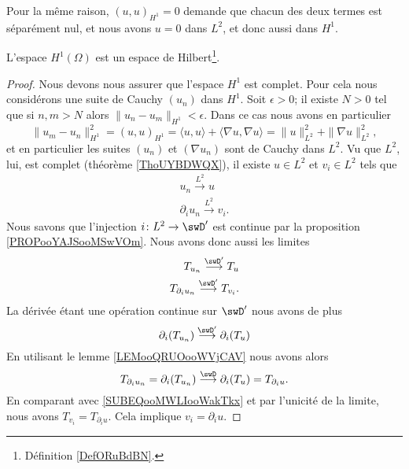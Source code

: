 Pour la même raison, \( (u,u)_{H^1}=0\) demande que chacun des deux termes est séparément nul, et nous avons \( u=0\) dans \( L^2\), et donc aussi dans \( H^1\).

\begin{theorem}
    L'espace \( H^1(\Omega)\) est un espace de Hilbert\footnote{Définition \ref{DefORuBdBN}.}.
\end{theorem}

\begin{proof}
    Nous devons nous assurer que l'espace \( H^1\) est complet. Pour cela nous considérons une suite de Cauchy \( (u_n)\) dans \( H^1\). Soit \( \epsilon>0\); il existe \( N>0\) tel que si \( n,m>N\) alors \( \| u_n-u_m \|_{H^1}<\epsilon\). Dans ce cas nous avons en particulier
    \begin{equation}
        \| u_m-u_n \|_{H^1}^2=(u,u)_{H^1}=\langle u, u\rangle +\langle \nabla u, \nabla u\rangle =\| u \|_{L^2}^2+\| \nabla u \|_{L^2}^2,
    \end{equation}
    et en particulier les suites \( (u_n)\) et \( (\nabla u_n)\) sont de Cauchy dans \( L^2\). Vu que \( L^2\), lui, est complet (théorème \ref{ThoUYBDWQX}), il existe \( u\in L^2\) et \( v_i\in L^2\) tels que
    \begin{subequations}
        \begin{align}
            u_n\stackrel{L^2}{\longrightarrow}u\\
            \partial_iu_n\stackrel{L^2}{\longrightarrow}v_i.
        \end{align}
    \end{subequations}
    Nous savons que l'injection \( i\colon L^2\to \swD'\) est continue par la proposition \ref{PROPooYAJSooMSwVOm}. Nous avons donc aussi les limites
    \begin{subequations}
        \begin{align}
            T_{u_n}\stackrel{\swD'}{\longrightarrow}T_u\\
            T_{\partial_i u_n}\stackrel{\swD'}{\longrightarrow}T_{v_i}.     \label{SUBEQooMWLIooWakTkx}
        \end{align}
    \end{subequations}
    La dérivée étant une opération continue sur \( \swD'\) nous avons de plus
    \begin{equation}
        \partial_i(T_{u_n})\stackrel{\swD'}{\longrightarrow}\partial_i(T_u)
    \end{equation}
    En utilisant le lemme \ref{LEMooQRUOooWVjCAV} nous avons alors
    \begin{equation}
        T_{\partial_iu_n}=\partial_i(T_{u_n})\stackrel{\swD}{\longrightarrow}\partial_i(T_u)=T_{\partial_iu}.
    \end{equation}
    En comparant avec \eqref{SUBEQooMWLIooWakTkx} et par l'unicité de la limite, nous avons \( T_{v_i}=T_{\partial_iu}\). Cela implique \( v_i=\partial_iu\).


\end{proof}
